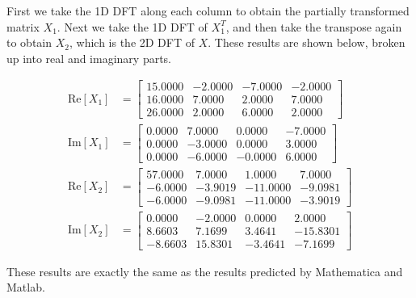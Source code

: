 \documentclass[twocolumn]{myarticle}
\begin{document}
First we take the 1D DFT along each column to obtain the partially transformed matrix $ X_1 $.
Next we take the 1D DFT of $ X_1^T $, and then take the transpose again to obtain $ X_2 $, which is the 2D DFT of $ X $.
These results are shown below, broken up into real and imaginary parts.

\begin{align}
    \text{Re}[X_1] &= 
    \begin{bmatrix}
         15.0000  &
         -2.0000  &
         -7.0000  &
         -2.0000 
         \\
         16.0000  &
          7.0000  &
          2.0000  &
          7.0000 
         \\
         26.0000  &
          2.0000  &
          6.0000  &
          2.0000 
    \end{bmatrix}
    \\
    \text{Im}[X_1] &= 
    \begin{bmatrix}
          0.0000 &
          7.0000 &
          0.0000 &
         - 7.0000
        \\ 
          0.0000 &
         - 3.0000 &
          0.0000 &
          3.0000
        \\ 
          0.0000 &
         - 6.0000 &
         - 0.0000 &
          6.0000
    \end{bmatrix}
    \\
    \text{Re}[X_2] &=
    \begin{bmatrix}
         57.0000 &
          7.0000 &
          1.0000 &
          7.0000
         \\
         -6.0000 &
         -3.9019 &
        -11.0000 &
         -9.0981
         \\
         -6.0000 &
         -9.0981 &
        -11.0000 &
         -3.9019
    \end{bmatrix}
    \\
    \text{Im}[X_2] &=
    \begin{bmatrix}
          0.0000 &
        -  2.0000 &
          0.0000 &
          2.0000
        \\
          8.6603 &
          7.1699 &
          3.4641 &
        - 15.8301
        \\
        -  8.6603 &
         15.8301 &
        -  3.4641 &
        -  7.1699
    \end{bmatrix}
\end{align}

These results are exactly the same as the results predicted by Mathematica and Matlab.
\end{document}
